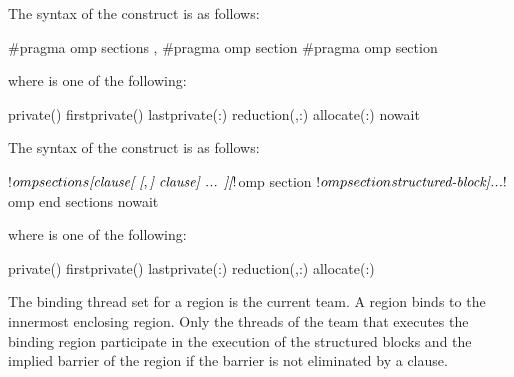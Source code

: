 \syntax
\begin{ccppspecific}
The syntax of the  construct is as follows:

\begin{ompcPragma}
#pragma omp sections \plc{[clause[ [},\plc{] clause] ... ] new-line}
   {
   \plc{[}#pragma omp section \plc{]}
   \plc{[}#pragma omp section 
      \plc{structured-block]}
   }
\end{ompcPragma}

where  is one of the following:

{}
\begin{indentedcodelist}
private()
firstprivate()
lastprivate(\plc{[ lastprivate-modifier}:\plc{] list})
reduction(\plc{[reduction-modifier },\plc{] reduction-identifier }:)
allocate(\plc{[allocator }:\plc{] list})
nowait
\end{indentedcodelist}
\end{ccppspecific}

\begin{fortranspecific}
The syntax of the  construct is as follows:

\begin{ompfPragma}
!$omp sections \plc{[clause[ [},\plc{] clause] ... ]}
   \plc{[}!$omp section\plc{]}
   \plc{[}!$omp section
      \plc{structured-block]}
   \plc{...}
!$omp end sections \plc{[}nowait\plc{]}
\end{ompfPragma}

\begin{samepage}
where  is one of the following:

{}
\begin{indentedcodelist}
private()
firstprivate()
lastprivate(\plc{[ lastprivate-modifier}:\plc{] list})
reduction(\plc{[reduction-modifier },\plc{] reduction-identifier }:)
allocate(\plc{[allocator }:\plc{] list})
\end{indentedcodelist}
\end{samepage}
\end{fortranspecific}

\binding
The binding thread set for a  region is the current team. A 
 region binds to the innermost enclosing  region. 
Only the threads of the team that executes the binding  region 
participate in the execution of the structured blocks and the implied barrier 
of the  region if the barrier is not eliminated by a 
 clause.

